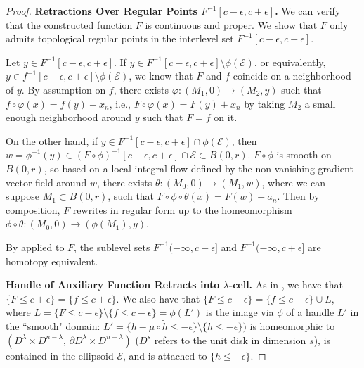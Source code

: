 \documentclass[11pt]{article}
\newcommand{\eps}{\epsilon}
\newcommand{\bord}{\partial}
\newcommand{\inter}{\cap}
\newcommand{\union}{\cup}
\theoremstyle{plain}
\theoremstyle{definition}
\theoremstyle{remark}
\begin{document}
\begin{proof}
		\textbf{Retractions Over Regular Points $F^{-1}[c-\eps,c+\eps]$. }
		We can verify that the constructed function $F$ is continuous and proper.  We show that $F$ only admits topological regular points in the interlevel set $F^{-1}[c-\eps,c+\eps]$.
		
		Let $y \in F^{-1}[c-\eps,c+\eps]$. 
		If $y \in F^{-1}[c-\eps,c+\eps] \setminus \phi(\mathcal{E})$, or equivalently, $y \in f^{-1}[c-\eps,c+\eps] \setminus \phi(\mathcal{E})$, we know that $F$ and $f$ coincide on a neighborhood of $y$. By assumption on $f$, there exists $\varphi : (M_1, 0) \to (M_2, y)$ such that $f \circ \varphi(x) = f(y) + x_n$, i.e., $F \circ \varphi(x) = F(y) + x_n$ by taking $M_2$ a small enough neighborhood around $y$ such that $F = f$ on it.
		
		On the other hand, if $y \in F^{-1}[c-\eps,c+\eps] \inter \phi(\mathcal{E})$, then $w = \phi^{-1}(y) \in (F \circ \phi)^{-1}[c-\eps,c+\eps] \inter \mathcal{E} \subset B(0,r)$. $F \circ \phi$ is smooth on $B(0,r)$, so based on a local integral flow defined by the non-vanishing gradient vector field around $w$,
		there exists $\theta : (M_0, 0) \to (M_1, w)$, where we can suppose $M_1 \subset B(0,r)$, such that $F \circ \phi \circ \theta(x) = F(w) + a_n$. Then by composition, $F$ rewrites in regular form up to the homeomorphism $\phi \circ \theta : (M_0, 0) \to (\phi(M_1),y)$.
		
		By  applied to $F$, the sublevel sets $F^{-1}(-\infty, c-\eps]$ and $F^{-1}(-\infty, c+\eps]$ are homotopy equivalent.
		
		\textbf{Handle of Auxiliary Function Retracts into $\lambda$-cell.}
		As in \cite{milnor_morse_1963}, we have that $\{F \leq c + \eps\} = \{f \leq c + \eps\}$. We also have that $\{F \leq c - \eps\} = \{f \leq c - \eps\} \union L$, where $L = \{F \leq c - \eps\} \setminus \{f \leq c - \eps\} = \phi(L')$ is the image via $\phi$ of a handle $L'$ in the ``smooth" domain: $L' = \{h - \mu \circ \widetilde{h} \leq -\eps \} \setminus \{h \leq -\eps\})$ is homeomorphic to $(D^\lambda \times D^{n - \lambda},\, \bord D^\lambda \times D^{n - \lambda})$ ($D^s$ refers to the unit disk in dimension $s$), is contained in the ellipsoid $\mathcal{E}$, and is attached to $\{h \leq - \eps\}$.
		

\end{proof}
\end{document}

